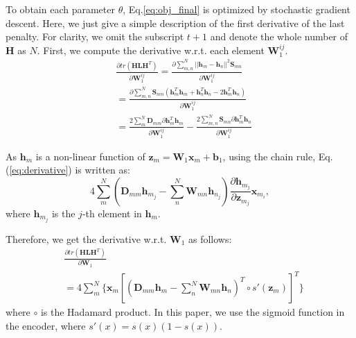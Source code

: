 \documentclass{article}
\def \bb{\mathbf b}
\def \x{\mathbf x}
\def \z{\mathbf z}
\def \h{\mathbf h}
\def \D{\mathbf D}
\def \HH{\mathbf H}
\def \LL{\mathbf L}
\def \SSS{\mathbf S}
\def \W{\mathbf W}
\begin{document}

To obtain each parameter $\theta$, Eq.\ref{eq:obj_final} is optimized by stochastic gradient descent. Here, we just give a simple description of the first derivative of the last penalty. For clarity, we omit the subscript $t+1$ and denote the whole number of $\HH$ as $N$.  First, we compute the derivative w.r.t. each element $\W_1^{ij}$.
\begin{equation}
  \begin{split}
    &\frac{\partial tr(\HH \LL \HH^T)}{\partial \W_1^{ij}} = \frac{\partial \sum_{m,n}^N||\h_m - \h_n||^2\SSS_{mn}}{\partial \W_1^{ij}} \\
    & = \frac{\partial \sum_{m,n}^N \SSS_{mn}(\h_m^T\h_m + \h_n^T\h_n - 2\h_m^T\h_n)}{\partial \W_1^{ij}}\\
    & = \frac{2\sum_m^N \D_{mm} \partial \h_m^T\h_m}{\partial \W_1^{ij}} - \frac{2\sum_{m,n}^N \SSS_{mn}\partial \h_m^T\h_n}{\partial \W_1^{ij}}
  \end{split}
  \label{eq:derivative}
\end{equation}

As $\h_m$ is a non-linear function of $\z_m = \W_1 \x_m + \bb_1$, using the chain rule, Eq.(\ref{eq:derivative}) is written as:
\begin{equation}
4\sum_m^N(\D_{mm} \h_{m_j} - \sum_{n}^N \W_{mn}\h_{n_j})\frac{\partial \h_{m_j}}{\partial \z_{m_j}} \x_{m_i},
\end{equation}
where $\h_{m_j}$ is the $j$-th element in $\h_m$.

Therefore, we get the derivative w.r.t. $\W_1$ as follows:
\begin{equation}
\begin{split}
  &\frac{\partial tr(\HH \LL \HH^T)}{\partial \W_1}\\
  & = 4 \sum_{m}^N \{ \x_m[(\D_{mm} \h_m  - \sum_{n}^N\W_{mn}\h_n)^T \circ s'(\z_m)]^T\}
\end{split}
\end{equation}
where $\circ$ is the Hadamard product. In this paper, we use the sigmoid function in the encoder, where $s'(x) = s(x)(1-s(x))$.
\end{document}
